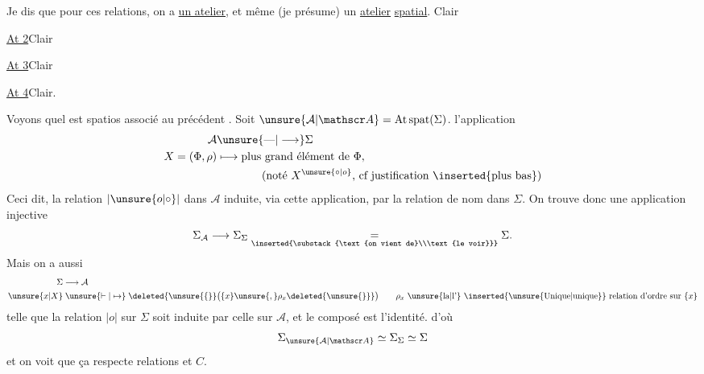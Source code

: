 Je dis que pour ces relations, on a \uline{un atelier},  et même (je présume) un \uline{atelier} \uline{spatial}.
\quad Clair

\uline{At 2}\quad Clair 

\uline{At 3}\quad Clair

\uline{At 4}\quad Clair.

 Voyons quel est    spatios associé au précédent .  Soit $\unsure{\mathcal A|\mathscr A}=\mathrm{At}\,\mathrm{spat}(\Sigma)$.  \deleted{$(\unsure{\Phi|\varPhi},\rho)$} l'application
\[
\begin{aligned}
\mathcal A&\unsure{\text{\textemdash}|\longrightarrow}\Sigma\\
X=(\Phi,\rho)&\longmapsto\text{plus grand élément de }\Phi,\\
&\hspace{4em}\text{(noté }X^{\unsure{\circ|o}}\text{, cf justification \inserted{plus bas})}
\end{aligned}
\]
Ceci dit, la relation $\mathrel{|\unsure{o|\circ}|}$ dans $\mathcal A$  induite, via cette application, par la relation de  nom dans $\Sigma$. On trouve donc une application injective
\[
\Sigma_{\mathcal A}\longrightarrow\Sigma_{\Sigma}
\underset{\inserted{\substack{\text{on vient de}\\\text{le voir}}}}{=}\Sigma.
\]
Mais on a aussi
\[
\begin{aligned}
\Sigma&\longrightarrow\mathcal A\\
\unsure{x|X}&\mathrel{\unsure{\vdash|\mapsto}}\deleted{\unsure{\{}}\bigl(\{x\}\unsure{,}\rho_x\deleted{\unsure{\}}}\bigr)
\qquad \rho_x\ \text{\unsure{la|l'} \inserted{\unsure{Unique|unique}} relation d'ordre sur }\{x\}
\end{aligned}
\]
telle que la relation $\mathrel{|o|}$ sur $\Sigma$ soit induite par celle sur $\mathcal A$, et le composé
est l'identité.
d'où
\[
\Sigma_{\unsure{\mathcal A|\mathscr A}}\simeq\Sigma_{\Sigma}\simeq\Sigma
\]
et on voit que ça respecte relations  et $C$.

